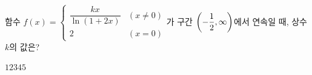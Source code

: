 함수 $f(x)=\begin{cases} \dfrac{kx}{\ln(1+2x)} & (x\ne 0) \\ 2 & (x=0) \end{cases}$가 구간 $\left(-\dfrac{1}{2}{,}\mkern3mu\mathopen{}\infty\right)$에서 연속일 때, 상수 $k$의 값은?
\begin{choices32}{$1$}{$2$}{$3$}{$4$}{$5$}\end{choices32}
